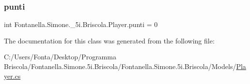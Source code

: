 \subsubsection{\texorpdfstring{punti}{punti}}
{\footnotesize\ttfamily int Fontanella.\+Simone.\+\_\+5i.\+Briscola.\+Player.\+punti = 0}



The documentation for this class was generated from the following file\+:\begin{DoxyCompactItemize}
\item 
C\+:/\+Users/\+Fonta/\+Desktop/\+Programma Briscola/\+Fontanella.\+Simone.\+5i.\+Briscola/\+Fontanella.\+Simone.\+5i.\+Briscola/\+Models/\hyperlink{_player_8cs}{Player.\+cs}\end{DoxyCompactItemize}
